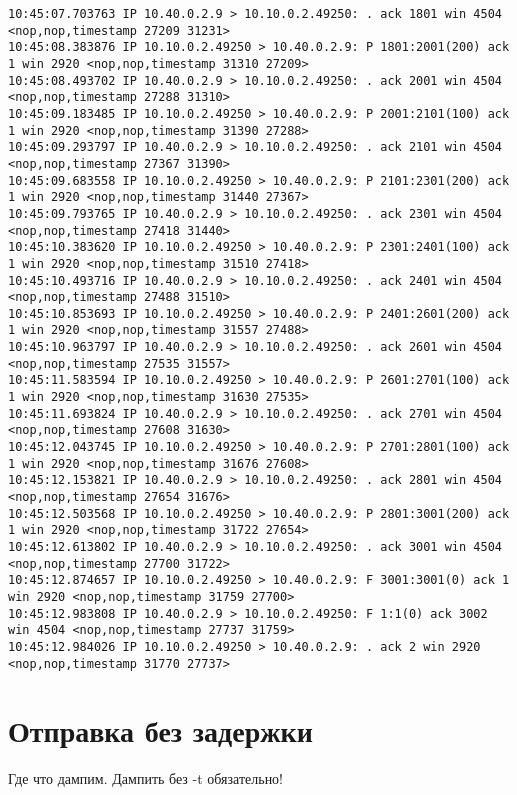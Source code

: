 \documentclass[a4paper,12pt]{article}
\begin{document}
\begin{Verbatim}
10:45:07.703763 IP 10.40.0.2.9 > 10.10.0.2.49250: . ack 1801 win 4504 <nop,nop,timestamp 27209 31231>
10:45:08.383876 IP 10.10.0.2.49250 > 10.40.0.2.9: P 1801:2001(200) ack 1 win 2920 <nop,nop,timestamp 31310 27209>
10:45:08.493702 IP 10.40.0.2.9 > 10.10.0.2.49250: . ack 2001 win 4504 <nop,nop,timestamp 27288 31310>
10:45:09.183485 IP 10.10.0.2.49250 > 10.40.0.2.9: P 2001:2101(100) ack 1 win 2920 <nop,nop,timestamp 31390 27288>
10:45:09.293797 IP 10.40.0.2.9 > 10.10.0.2.49250: . ack 2101 win 4504 <nop,nop,timestamp 27367 31390>
10:45:09.683558 IP 10.10.0.2.49250 > 10.40.0.2.9: P 2101:2301(200) ack 1 win 2920 <nop,nop,timestamp 31440 27367>
10:45:09.793765 IP 10.40.0.2.9 > 10.10.0.2.49250: . ack 2301 win 4504 <nop,nop,timestamp 27418 31440>
10:45:10.383620 IP 10.10.0.2.49250 > 10.40.0.2.9: P 2301:2401(100) ack 1 win 2920 <nop,nop,timestamp 31510 27418>
10:45:10.493716 IP 10.40.0.2.9 > 10.10.0.2.49250: . ack 2401 win 4504 <nop,nop,timestamp 27488 31510>
10:45:10.853693 IP 10.10.0.2.49250 > 10.40.0.2.9: P 2401:2601(200) ack 1 win 2920 <nop,nop,timestamp 31557 27488>
10:45:10.963797 IP 10.40.0.2.9 > 10.10.0.2.49250: . ack 2601 win 4504 <nop,nop,timestamp 27535 31557>
10:45:11.583594 IP 10.10.0.2.49250 > 10.40.0.2.9: P 2601:2701(100) ack 1 win 2920 <nop,nop,timestamp 31630 27535>
10:45:11.693824 IP 10.40.0.2.9 > 10.10.0.2.49250: . ack 2701 win 4504 <nop,nop,timestamp 27608 31630>
10:45:12.043745 IP 10.10.0.2.49250 > 10.40.0.2.9: P 2701:2801(100) ack 1 win 2920 <nop,nop,timestamp 31676 27608>
10:45:12.153821 IP 10.40.0.2.9 > 10.10.0.2.49250: . ack 2801 win 4504 <nop,nop,timestamp 27654 31676>
10:45:12.503568 IP 10.10.0.2.49250 > 10.40.0.2.9: P 2801:3001(200) ack 1 win 2920 <nop,nop,timestamp 31722 27654>
10:45:12.613802 IP 10.40.0.2.9 > 10.10.0.2.49250: . ack 3001 win 4504 <nop,nop,timestamp 27700 31722>
10:45:12.874657 IP 10.10.0.2.49250 > 10.40.0.2.9: F 3001:3001(0) ack 1 win 2920 <nop,nop,timestamp 31759 27700>
10:45:12.983808 IP 10.40.0.2.9 > 10.10.0.2.49250: F 1:1(0) ack 3002 win 4504 <nop,nop,timestamp 27737 31759>
10:45:12.984026 IP 10.10.0.2.49250 > 10.40.0.2.9: . ack 2 win 2920 <nop,nop,timestamp 31770 27737>
\end{Verbatim}

\section{Отправка без задержки}

Где что дампим.  Дампить без -t обязательно!
\end{document}
